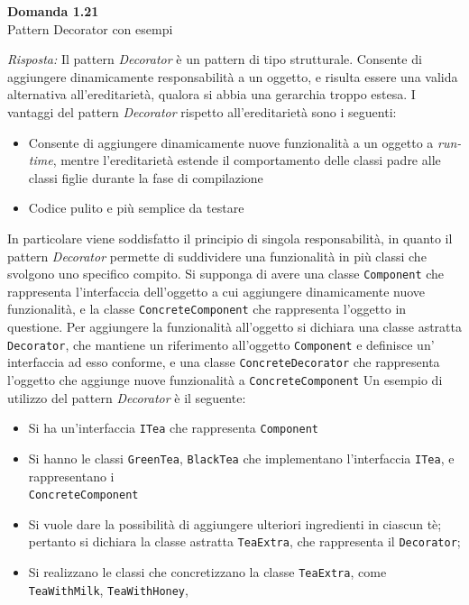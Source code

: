 \documentclass{article}
\newenvironment{problem}[2][Domanda]
    { \begin{mdframed}[backgroundcolor=gray!20] \textbf{#1 #2} \\}
    {  \end{mdframed}}
\newenvironment{solution}
    {\textit{Risposta:}}
    {}
\begin{document}
\begin{problem}{1.21}
Pattern Decorator con esempi
\end{problem}
\begin{solution}
Il pattern \textit{Decorator} è un pattern di tipo strutturale.
Consente di aggiungere dinamicamente responsabilità a un oggetto, e risulta essere una valida alternativa all'ereditarietà, qualora si abbia una gerarchia troppo estesa.
I vantaggi del pattern \textit{Decorator} rispetto all'ereditarietà sono i seguenti:
\begin{itemize}
	\item Consente di aggiungere dinamicamente nuove funzionalità a un oggetto a \textit{run-time}, mentre l'ereditarietà estende il comportamento delle classi padre alle classi figlie durante la fase di compilazione
	\item Codice pulito e più semplice da testare
\end{itemize}
In particolare viene soddisfatto il principio di singola responsabilità, in quanto il pattern \textit{Decorator} permette di suddividere una funzionalità in più classi che svolgono uno specifico compito.
\newline
Si supponga di avere una classe \texttt{Component} che rappresenta l'interfaccia dell'oggetto a cui aggiungere dinamicamente nuove funzionalità, e la classe \texttt{ConcreteComponent} che rappresenta l'oggetto in questione.
Per aggiungere la funzionalità all'oggetto si dichiara una classe astratta \texttt{Decorator}, che mantiene un riferimento all'oggetto \texttt{Component} e definisce un' interfaccia ad esso conforme, e una classe \texttt{ConcreteDecorator} che rappresenta l'oggetto che aggiunge nuove funzionalità a \texttt{ConcreteComponent}
Un esempio di utilizzo del pattern \textit{Decorator} è il seguente:
\begin{itemize}
\item Si ha un'interfaccia \texttt{ITea} che rappresenta \texttt{Component}
\item Si hanno le classi \texttt{GreenTea}, \texttt{BlackTea} che implementano l'interfaccia \texttt{ITea}, e rappresentano i
\\
\texttt{ConcreteComponent}
\item Si vuole dare la possibilità di aggiungere ulteriori ingredienti in ciascun tè; pertanto si dichiara la classe astratta \texttt{TeaExtra}, che rappresenta il \texttt{Decorator};
\item Si realizzano le classi che concretizzano la classe \texttt{TeaExtra}, come \texttt{TeaWithMilk}, \texttt{TeaWithHoney},

\end{itemize}
\end{solution}
\end{document}
